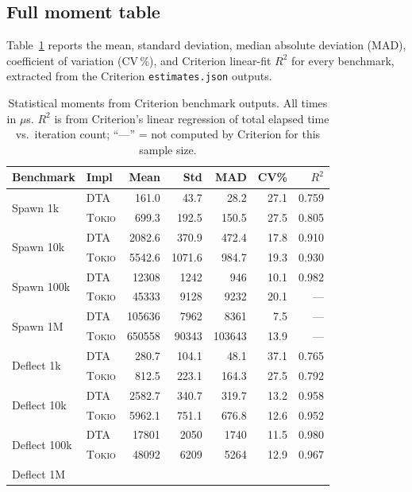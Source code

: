 \documentclass[11pt,a4paper]{article}
\newcommand{\dtact}{\textsc{DTA}}
\newcommand{\tokio}{\textsc{Tokio}}
\begin{document}
\subsection{Full moment table}

Table~\ref{tab:moments} reports the mean, standard deviation, median absolute
deviation (MAD), coefficient of variation (CV\,\%), and Criterion linear-fit
$R^2$ for every benchmark, extracted from the Criterion \texttt{estimates.json}
outputs.

\begin{table}[htbp]
\centering
\small
\caption{Statistical moments from Criterion benchmark outputs.
All times in $\mu$s.  $R^2$ is from Criterion's linear regression of
total elapsed time vs.\ iteration count; ``---'' = not computed by Criterion
for this sample size.}
\label{tab:moments}
\begin{tabularx}{\linewidth}{@{}lXrrrrr@{}}
\toprule
Benchmark & Impl & Mean & Std & MAD & CV\% & $R^2$ \\
\midrule
\multirow{2}{*}{Spawn 1k}
  & \dtact  & 161.0  & 43.7  & 28.2  & 27.1 & 0.759 \\
  & \tokio  & 699.3  & 192.5 & 150.5 & 27.5 & 0.805 \\
\multirow{2}{*}{Spawn 10k}
  & \dtact  & 2082.6 & 370.9 & 472.4 & 17.8 & 0.910 \\
  & \tokio  & 5542.6 & 1071.6 & 984.7 & 19.3 & 0.930 \\
\multirow{2}{*}{Spawn 100k}
  & \dtact  & 12308  & 1242  & 946   & 10.1 & 0.982 \\
  & \tokio  & 45333  & 9128  & 9232  & 20.1 & ---   \\
\multirow{2}{*}{Spawn 1M}
  & \dtact  & 105636 & 7962  & 8361  &  7.5 & ---   \\
  & \tokio  & 650558 & 90343 & 103643 & 13.9 & ---   \\
\midrule
\multirow{2}{*}{Deflect 1k}
  & \dtact  & 280.7  & 104.1 & 48.1  & 37.1 & 0.765 \\
  & \tokio  & 812.5  & 223.1 & 164.3 & 27.5 & 0.792 \\
\multirow{2}{*}{Deflect 10k}
  & \dtact  & 2582.7 & 340.7 & 319.7 & 13.2 & 0.958 \\
  & \tokio  & 5962.1 & 751.1 & 676.8 & 12.6 & 0.952 \\
\multirow{2}{*}{Deflect 100k}
  & \dtact  & 17801  & 2050  & 1740  & 11.5 & 0.980 \\
  & \tokio  & 48092  & 6209  & 5264  & 12.9 & 0.967 \\
\multirow{2}{*}{Deflect 1M}

\end{tabularx}
\end{table}
\end{document}
